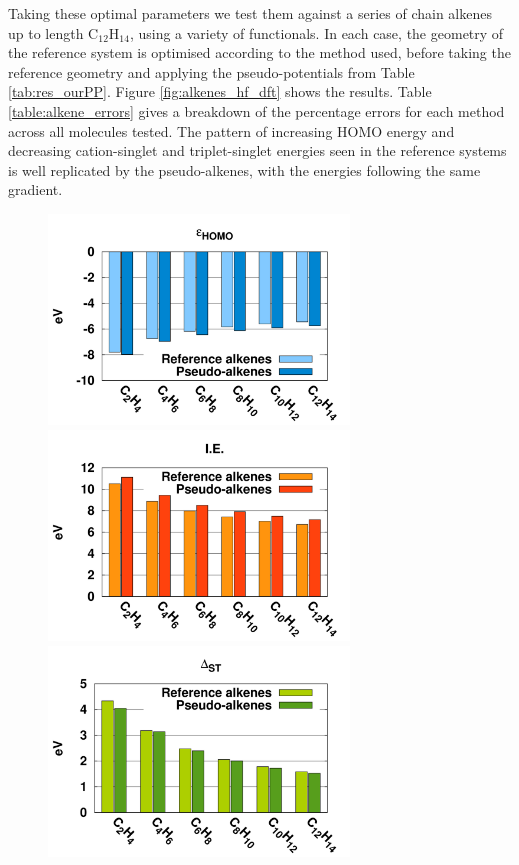 \documentclass[aip]{revtex4-1}
\begin{document}
Taking these optimal parameters we test them against a series of chain alkenes up to length C\(_{12}\)H\(_{14}\), using a variety of functionals. In each case, the geometry of the reference system is optimised according to the method used, 
before taking the reference geometry and applying the pseudo-potentials from Table \ref{tab:res_ourPP}. 
Figure \ref{fig:alkenes_hf_dft} shows the results.
Table \ref{table:alkene_errors} gives a breakdown of the percentage errors for each method across all molecules tested. The pattern of increasing HOMO energy and decreasing cation-singlet and triplet-singlet energies seen in the reference systems is well replicated by the pseudo-alkenes, with the energies following the same gradient.

\begin{figure}
\begin{center}
\includegraphics[width=8cm]{short_pbe0_homo}
\includegraphics[width=8cm]{short_pbe0_ie}
\includegraphics[width=8cm]{short_pbe0_st}

\end{center}
\end{figure}
\end{document}
